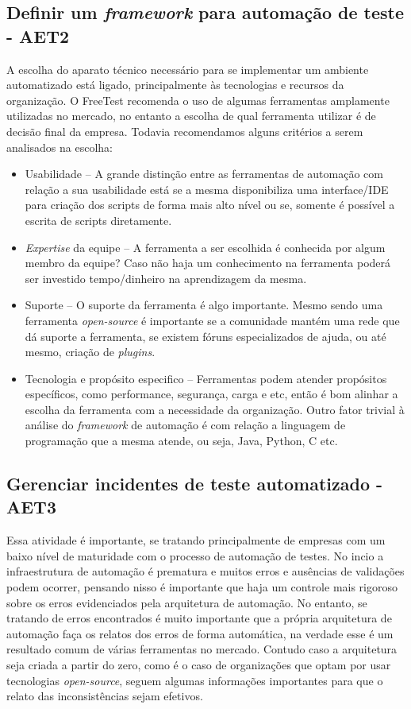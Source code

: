 \subsection{Definir um \textit{framework} para automação de teste - AET2}
\label{sec:guiaaet2}

A escolha do aparato técnico necessário para se implementar um ambiente automatizado está ligado, principalmente às tecnologias e recursos da organização. O FreeTest recomenda o uso de algumas ferramentas amplamente utilizadas no mercado, no entanto a escolha de qual ferramenta utilizar é de decisão final da empresa. Todavia recomendamos alguns critérios a serem analisados na escolha:

\begin{itemize}
    \item Usabilidade – A grande distinção entre as ferramentas de automação com relação a sua usabilidade está se a mesma disponibiliza uma interface/IDE para criação dos scripts de forma mais alto nível ou se, somente é possível a escrita de scripts diretamente.
    \item \textit{Expertise} da equipe – A ferramenta a ser escolhida é conhecida por algum membro da equipe? Caso não haja um conhecimento na ferramenta poderá ser investido tempo/dinheiro na aprendizagem da mesma.
    \item Suporte – O suporte da ferramenta é algo importante. Mesmo sendo uma ferramenta \textit{open-source} é importante se a comunidade mantém uma rede que dá suporte a ferramenta, se existem fóruns especializados de ajuda, ou até mesmo, criação de \textit{plugins}.
    \item Tecnologia e propósito especifico – Ferramentas podem atender propósitos específicos, como performance, segurança, carga e etc, então é bom alinhar a escolha da ferramenta com a necessidade da organização. Outro fator trivial à análise do \textit{framework} de automação é com relação a linguagem de programação que a mesma atende, ou seja, Java, Python, C etc.
\end{itemize}

\subsection{Gerenciar incidentes de teste automatizado - AET3}
\label{sec:guiaaet3}

Essa atividade é importante, se tratando principalmente de empresas com um baixo nível de maturidade com o processo de automação de testes. No incio a infraestrutura de automação é prematura e muitos erros e ausências de validações podem ocorrer, pensando nisso é importante que haja um controle mais rigoroso sobre os erros evidenciados pela arquitetura de automação.
No entanto, se tratando de erros encontrados é muito importante que a própria arquitetura de automação faça os relatos dos erros de forma automática, na verdade esse é um resultado comum de várias ferramentas no mercado. Contudo caso a arquitetura seja criada a partir do zero, como é o caso de organizações que optam por usar tecnologias \textit{open-source}, seguem algumas informações importantes para que o relato das inconsistências sejam efetivos.


